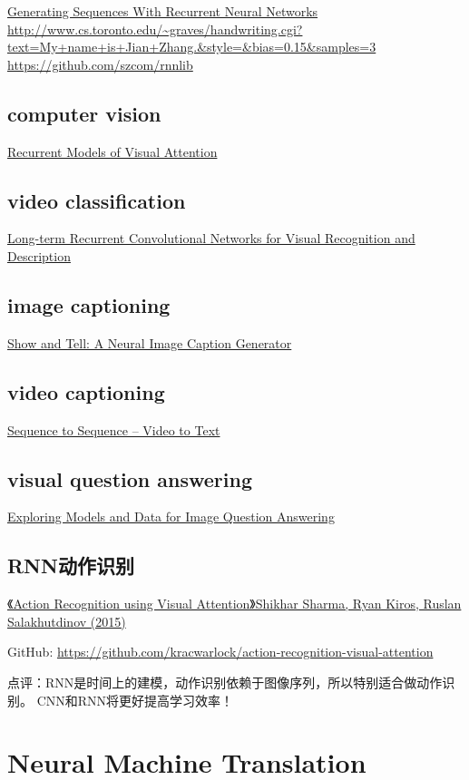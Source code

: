 \documentclass[UTF8,10pt,a4paper]{ctexbook}
\begin{document}
\href{https://arxiv.org/abs/1308.0850}{Generating Sequences With Recurrent Neural Networks}
\url{http://www.cs.toronto.edu/~graves/handwriting.cgi?text=My+name+is+Jian+Zhang.\&style=\&bias=0.15\&samples=3}
\url{https://github.com/szcom/rnnlib}

\subsection{computer vision}
\href{https://arxiv.org/abs/1406.6247}{Recurrent Models of Visual Attention}


\subsection{video classification}
\href{https://arxiv.org/abs/1411.4389}{Long-term Recurrent Convolutional Networks for Visual Recognition and Description}

\subsection{image captioning}
\href{https://arxiv.org/pdf/1411.4555.pdf}{Show and Tell: A Neural Image Caption Generator}

\subsection{video captioning}
\href{https://arxiv.org/abs/1505.00487}{Sequence to Sequence -- Video to Text}


\subsection{visual question answering}
\href{https://arxiv.org/abs/1505.02074}{Exploring Models and Data for Image Question Answering}


\subsection{RNN动作识别}
\href{http://t.cn/RU8EKNZ}{《Action Recognition using Visual Attention》Shikhar Sharma, Ryan Kiros, Ruslan Salakhutdinov (2015)}

GitHub: \url{https://github.com/kracwarlock/action-recognition-visual-attention}

点评：RNN是时间上的建模，动作识别依赖于图像序列，所以特别适合做动作识别。 CNN和RNN将更好提高学习效率！

\section{Neural Machine Translation}
\end{document}
